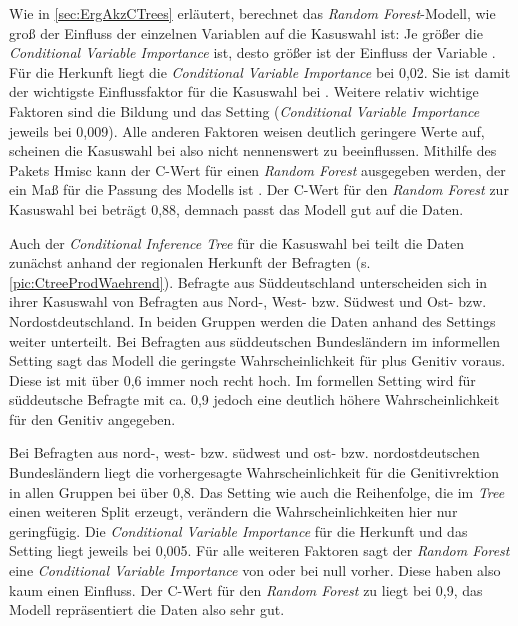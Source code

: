 Wie in \autoref{sec:ErgAkzCTrees} erläutert, berechnet das \textit{Random Forest}-Modell, wie groß der Einfluss der einzelnen Variablen auf die Kasuswahl ist:  
Je größer die \textit{Conditional Variable Importance} ist, desto größer ist der Einfluss der Variable \citep[s.][298--299]{Levshina.2015}. 
Für die Herkunft liegt die \textit{Conditional Variable Importance} bei 0,02. 
Sie ist damit der wichtigste Einflussfaktor für die Kasuswahl bei \wegen. 
Weitere relativ wichtige Faktoren sind die Bildung und das Setting (\textit{Conditional Variable Importance} jeweils bei 0,009). 
Alle anderen Faktoren weisen deutlich geringere Werte auf, scheinen die Kasuswahl bei \wegen{} also nicht nennenswert zu beeinflussen. 
Mithilfe des Pakets Hmisc \citep[][Version 4.4-0]{Harrell.2020} kann der C-Wert für einen \textit{Random Forest} ausgegeben werden, der ein Maß für die Passung des Modells ist \citep[s.][299]{Levshina.2015}. 
Der C-Wert für den \textit{Random Forest} zur Kasuswahl bei \wegen{} beträgt 0,88, demnach passt das Modell gut auf die Daten.  

Auch der \textit{Conditional Inference Tree} für die Kasuswahl bei \waehrend{} teilt die Daten zunächst anhand der regionalen Herkunft der Befragten (s. \autoref{pic:CtreeProdWaehrend}). 
Befragte aus Süddeutschland unterscheiden sich in ihrer Kasuswahl von Befragten aus Nord-, West- bzw. Südwest und Ost- bzw. Nordostdeutschland. 
In beiden Gruppen werden die Daten anhand des Settings weiter unterteilt. 
Bei Befragten aus süddeutschen Bundesländern im informellen Setting sagt das Modell die geringste Wahrscheinlichkeit für \waehrend{} plus Genitiv voraus.
Diese ist mit über 0,6 immer noch recht hoch. 
Im formellen Setting wird für süddeutsche Befragte mit ca. 0,9 jedoch eine deutlich höhere Wahrscheinlichkeit für den Genitiv angegeben. 

Bei Befragten aus nord-, west- bzw. südwest und ost- bzw. nordostdeutschen Bundesländern liegt die vorhergesagte Wahrscheinlichkeit für die Genitivrektion in allen Gruppen bei über 0,8. 
Das Setting wie auch die Reihenfolge, die im \textit{Tree} einen weiteren Split erzeugt, verändern die Wahrscheinlichkeiten hier nur geringfügig. 
Die \textit{Conditional Variable Importance} für die Herkunft und das Setting liegt jeweils bei 0,005. 
Für alle weiteren Faktoren sagt der \textit{Random Forest} eine \textit{Conditional Variable Importance} von oder bei null vorher. 
Diese haben also kaum einen Einfluss. 
Der C-Wert für den \textit{Random Forest} zu \waehrend{} liegt bei 0,9, das Modell repräsentiert die Daten also sehr gut. 
%

